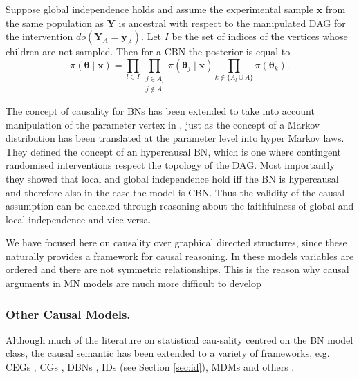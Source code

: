 \begin{proposition}
 Suppose global independence holds and assume the experimental sample $\bm{x}$ from the same population as $\bm{Y}$ is ancestral with respect to the manipulated \gls{DAG} for the intervention $do(\bm{Y}_A=\bm{y}_A)$. Let $I$ be the set of indices of the vertices whose children are not sampled. Then for a \gls{CBN} the posterior is equal to
 \begin{equation*}
 \pi(\bm{\theta}\;|\;\bm{x})=\prod_{l\in I}\prod_{\substack{j\in A_l\\j\not\in A}}\pi(\bm{\theta}_j\;|\;\bm{x})\prod_{k\not\in \{A_l\cup A\}}\pi(\bm{\theta}_k).
 \end{equation*}
\end{proposition}

The concept of causality for \glspl{BN} has been extended to take into account manipulation of the parameter vertex in \citet{Daneshkhah2004}, just as the concept of a Markov distribution has been translated at the parameter level into hyper Markov laws. They defined the concept of an hypercausal \gls{BN}, which is one where contingent randomised interventions respect the topology of the \gls{DAG}. Most importantly they showed that local and global independence hold \gls{iff} the \gls{BN} is hypercausal and therefore also in the case the model is \gls{CBN}. Thus the validity of the causal assumption can be checked through reasoning about the faithfulness of global and local independence and vice versa. 

We have focused here on causality over graphical directed structures, since these naturally provides a framework for causal reasoning. In these models variables are ordered and there are not symmetric relationships. This is the reason why causal arguments in \gls{MN} models are much more difficult to develop \citep[see e.g.][]{Lauritzen2002}

\subsubsection{Other Causal Models.}
Although much of the literature on statistical cau-sality centred on the \gls{BN} model class, the causal semantic has been extended to a variety of frameworks, e.g. \glspl{CEG} \citep{Thwaites2010}, \glspl{CG} \citep{Lauritzen2002}, \glspl{DBN} \citep{Eichler2007}, \glspl{ID} \citep{Dawid2002a} (see Section \ref{sec:id}), \glspl{MDM} \citep{Queen2009} and  others \citep{Aalen2012, Dawid2010, Smith2007}. 
 
